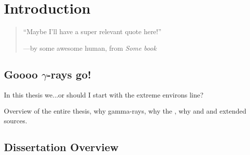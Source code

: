 \chapter{Introduction}
\label{chap:intro}

\begin{quote}
	``Maybe I'll have a super relevant quote here!'' 
	\begin{center}---by some awesome human, from \it{Some book} \end{center}
\end{quote}

\section{Goooo $\gamma$-rays go!}

In this thesis we...or should I start with the extreme environs line?

Overview of the entire thesis, why gamma-rays, why the \lat, why \snr and \pwn and extended sources.
\section{Dissertation Overview}